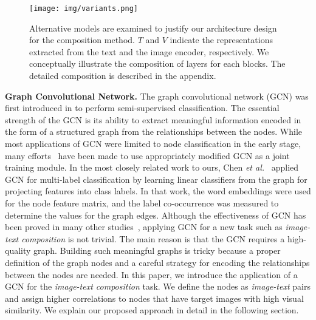 \documentclass[10pt,twocolumn,letterpaper]{article}
\begin{document}
\begin{figure*}[t!]
    \begin{center}
	    \texttt{[image: img/variants.png]}
	\end{center}
	\caption{Alternative models are examined to justify our architecture design for the composition method. $T$ and $V$ indicate the representations extracted from the text and the image encoder, respectively. We conceptually illustrate the composition of layers for each blocks. The detailed composition is described in the appendix.}
	\label{fig:variants}
\end{figure*}

\noindent
\textbf{Graph Convolutional Network.}
The graph convolutional network (GCN) was first introduced in \cite{kipf2016semi} to perform semi-supervised classification. The essential strength of the GCN is its ability to extract meaningful information encoded in the form of a structured graph from the relationships between the nodes. While most applications of GCN were limited to node classification in the early stage, many efforts~\cite{chen2019multi,liu2020od,chen2020hierarchical,liu2019guided} have been made to use appropriately modified GCN as a joint training module. In the most closely related work to ours, Chen \textit{et al.}~\cite{chen2019multi} applied GCN for multi-label classification by learning linear classifiers from the graph for projecting features into class labels. In that work, the word embeddings were used for the node feature matrix, and the label co-occurrence was measured to determine the values for the graph edges. Although the effectiveness of GCN has been proved in many other studies~\cite{you2020l2,wei2020view,cheng2020skeleton}, applying GCN for a new task such as \textit{image-text composition} is not trivial. The main reason is that the GCN requires a high-quality graph. Building such meaningful graphs is tricky because a proper definition of the graph nodes and a careful strategy for encoding the relationships between the nodes are needed. In this paper, we introduce the application of a GCN for the \textit{image-text composition} task. We define the nodes as \textit{image-text} pairs and assign higher correlations to nodes that have target images with high visual similarity. We explain our proposed approach in detail in the following section.
\end{document}
